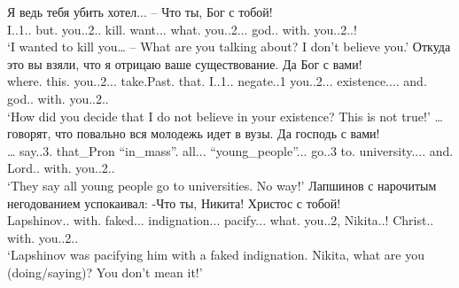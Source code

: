 \documentclass[output=paper]{langscibook}
\begin{document}
\ea
\ea
\gll Я ведь тебя убить хотел... – Что ты, Бог с тобой!\\
     I.{\PRON}.1.{\NOM}.{\SG} but.{\PTCP} you.{\PRON}.2.{\ACC}.{\SG} kill.{\glossINF} want.{\PAST}.{\glossM}{\SG}. what.{\PRON} you.{\PRON}.2.{\NOM}.{\SG}. god.{\NOUN}.{\NOM} with.{\PREP} you.{\PRON}.2.{\INSTR}.{\SG}!\\
\glt `I wanted to kill you… – What are you talking about? I don’t believe you.'
\ex
\gll Откуда это вы взяли, что я отрицаю ваше существование. Да Бог с вами!\\
     where.{\PRON} this.{\PRON} you.{\PRON}.2.{\NOM}.{\PL}. take.Past.{\PL} that.{\PRON} I.{\PRON}.1.{\NOM}.{\SG} negate.{\PRES}.1{\SG} you.{\PRON}.2.{\POSS}.{\ACC}.{\SG} existence.{\NOUN}.{\ACC}.{\SG}. and.{\PTCP} god.{\NOUN}.{\NOM} with.{\PREP} you.{\PRON}.2.{\INSTR}.{\PL}\\
\glt `How did you decide that I do not believe in your existence? This is not true!'
\ex
\gll … говорят, что повально вся молодежь идет в вузы. Да господь с вами!\\
     … say.{\PRES}.3.{\PL} that\_Pron “in\_mass”.{\ADV} all.{\PRON}{\glossF}.{\NOM}.{\SG} ``young\_people”.{\NOUN}.{\NOM}.{\SG} go.{\PRES}.3{\SG} to.{\PREP} university.{\NOUN}.{\ACC}.{\PL}. and.{\PTCP} Lord.{\NOUN}.{\NOM} with.{\PREP} you.{\PRON}.2.{\INSTR}.{\PL}\\
\glt `They say all young people go to universities. No way!'
\ex
\gll Лапшинов с нарочитым негодованием успокаивал: -Что ты, Никита! Христос с тобой!\\
     Lapshinov.{\NOUNPROPER}.{\NOM} with.{\PREP} faked.{\ADJ}.{\INSTR}.{\SG} indignation.{\NOUN}.{\INSTR}.{\SG} pacify.{\PAST}.{\glossM}{\SG}. what.{\PRON} you.{\PRON}.2{\SG}, Nikita.{\NOUNPROPER}.{\NOM}! Christ.{\NOUN}.{\NOM} with.{\PREP} you.{\PRON}.2.{\INSTR}.{\SG}\\
\glt `Lapshinov was pacifying him with a faked indignation. Nikita, what are you (doing/saying)? You don’t mean it!'
\z
\z
\end{document}
